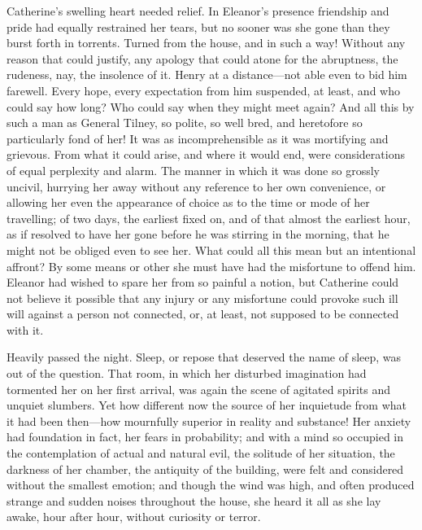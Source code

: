Catherine's swelling heart needed relief. In Eleanor's presence friendship and pride had equally restrained her tears, but no sooner was she gone than they burst forth in torrents. Turned from the house, and in such a way! Without any reason that could justify, any apology that could atone for the abruptness, the rudeness, nay, the insolence of it. Henry at a distance---not able even to bid him farewell. Every hope, every expectation from him suspended, at least, and who could say how long? Who could say when they might meet again? And all this by such a man as General Tilney, so polite, so well bred, and heretofore so particularly fond of her! It was as incomprehensible as it was mortifying and grievous. From what it could arise, and where it would end, were considerations of equal perplexity and alarm. The manner in which it was done so grossly uncivil, hurrying her away without any reference to her own convenience, or allowing her even the appearance of choice as to the time or mode of her travelling; of two days, the earliest fixed on, and of that almost the earliest hour, as if resolved to have her gone before he was stirring in the morning, that he might not be obliged even to see her. What could all this mean but an intentional affront? By some means or other she must have had the misfortune to offend him. Eleanor had wished to spare her from so painful a notion, but Catherine could not believe it possible that any injury or any misfortune could provoke such ill will against a person not connected, or, at least, not supposed to be connected with it.

Heavily passed the night. Sleep, or repose that deserved the name of sleep, was out of the question. That room, in which her disturbed imagination had tormented her on her first arrival, was again the scene of agitated spirits and unquiet slumbers. Yet how different now the source of her inquietude from what it had been then---how mournfully superior in reality and substance! Her anxiety had foundation in fact, her fears in probability; and with a mind so occupied in the contemplation of actual and natural evil, the solitude of her situation, the darkness of her chamber, the antiquity of the building, were felt and considered without the smallest emotion; and though the wind was high, and often produced strange and sudden noises throughout the house, she heard it all as she lay awake, hour after hour, without curiosity or terror.

